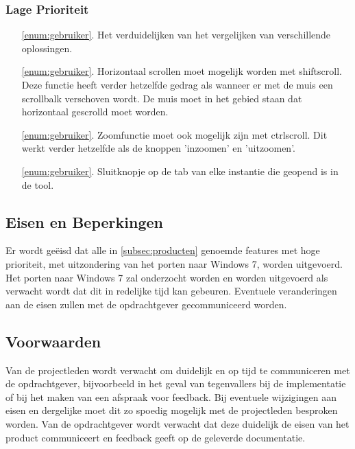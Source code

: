 \subsubsection*{Lage Prioriteit}
\begin{itemize}
	\item[\ref{enum:gebruiker}.] Het verduidelijken van het vergelijken van verschillende oplossingen.
	\item[\ref{enum:gebruiker}.] Horizontaal scrollen moet mogelijk worden met shift\plus scroll. Deze functie heeft verder hetzelfde gedrag als wanneer er met de muis een scrollbalk verschoven wordt. De muis moet in het gebied staan dat horizontaal gescrolld moet worden. 
	\item[\ref{enum:gebruiker}.] Zoomfunctie moet ook mogelijk zijn met ctrl\plus scroll. Dit werkt verder hetzelfde als de knoppen 'inzoomen' en 'uitzoomen'.
	\item[\ref{enum:gebruiker}.] Sluitknopje op de tab van elke instantie die geopend is in de tool.
\end{itemize}

\subsection{Eisen en Beperkingen}
Er wordt ge\"eisd dat alle in \ref{subsec:producten} genoemde features met hoge prioriteit, met uitzondering van het porten naar Windows 7, worden uitgevoerd. Het porten naar Windows 7 zal onderzocht worden en worden uitgevoerd als verwacht wordt dat dit in redelijke tijd kan gebeuren. Eventuele veranderingen aan de eisen zullen met de opdrachtgever gecommuniceerd worden.

\subsection{Voorwaarden}
Van de projectleden wordt verwacht om duidelijk en op tijd te communiceren met de opdrachtgever, bijvoorbeeld in het geval van tegenvallers bij de implementatie of bij het maken van een afspraak voor feedback. Bij eventuele wijzigingen aan eisen en dergelijke moet dit zo spoedig mogelijk met de projectleden besproken worden. Van de opdrachtgever wordt verwacht dat deze duidelijk de eisen van het product communiceert en feedback geeft op de geleverde documentatie.
